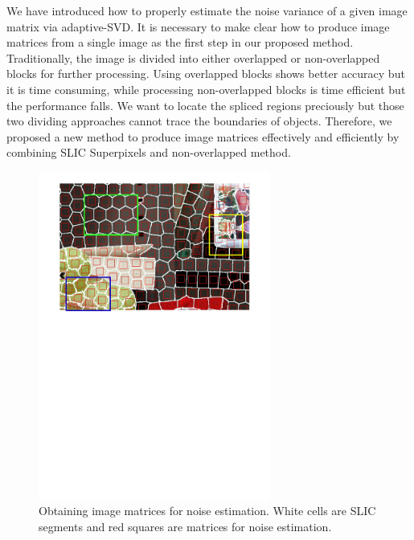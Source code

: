 \documentclass[a4paper, 12pt, twoside]{report}
\begin{document}
We have introduced how to properly estimate the noise variance of a given image matrix via adaptive-SVD. It is necessary to make clear how to produce image matrices from a single image as the first step in our proposed method. Traditionally, the image is divided into either overlapped or non-overlapped blocks for further processing. Using overlapped blocks shows better accuracy but it is time consuming, while processing non-overlapped blocks is time efficient but the performance falls. We want to locate the spliced regions preciously but those two dividing approaches cannot trace the boundaries of objects. Therefore, we proposed a new method to produce image matrices effectively and efficiently by combining SLIC Superpixels and non-overlapped method.

\begin{figure}[!htbp]
	\centering
	\includegraphics[width=3in]{RegularSegment.pdf}
	\caption{Obtaining image matrices for noise estimation. White cells are SLIC segments and red squares are matrices for noise estimation.}
	\label{segment}
\end{figure}
\end{document}
